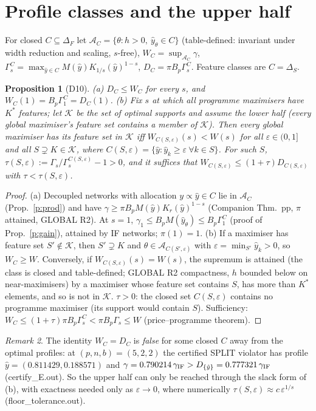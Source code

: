 \documentclass[11pt]{article}
\newtheorem{proposition}{Proposition}[section]\newtheorem{lemma}[proposition]{Lemma}\newtheorem{corollary}[proposition]{Corollary}
\theoremstyle{remark}\newtheorem{remark}[proposition]{Remark}
\begin{document}
\section{Profile classes and the upper half}
For closed $C\subseteq\Delta_F$ let $\mathcal A_C=\{\theta:h>0,\ \hat y_\theta\in C\}$ (table-defined: invariant under width reduction and scaling, $s$-free),
$W_C=\sup_{\mathcal A_C}\gamma$, $\Gamma^C_s=\max_{\hat y\in C}M(\hat y)K_{1/s}(\hat y)^{1-s}$, $D_C=\pi B_p\Gamma^C_s$. Feature classes are $C=\Delta_S$.
\begin{proposition}[D10]\label{p:uh}
(a) $D_C\le W_C$ for every $s$, and $W_C(1)=B_p\Gamma^C_1=D_C(1)$.
(b) Fix $s$ at which all programme maximisers have $K^*$ features; let $\mathcal K$ be the set of optimal supports and assume the lower half (every global maximiser's
feature set contains a member of $\mathcal K$). Then every global maximiser has its feature set in $\mathcal K$ iff $W_{C(S,\varepsilon)}(s)<W(s)$ for all
$\varepsilon\in(0,1]$ and all $S\supsetneq K\in\mathcal K$, where $C(S,\varepsilon)=\{\hat y:\hat y_k\ge\varepsilon\ \forall k\in S\}$. For such $S$,
$\tau(S,\varepsilon):=\Gamma_s/\Gamma^{C(S,\varepsilon)}_s-1>0$, and it suffices that $W_{C(S,\varepsilon)}\le(1+\tau)D_{C(S,\varepsilon)}$ with $\tau<\tau(S,\varepsilon)$.
\end{proposition}
\begin{proof}
(a) Decoupled networks with allocation $y\propto\hat y\in C$ lie in $\mathcal A_C$ (Prop.~\ref{p:prod}) and have $\gamma\ge\pi B_pM(\hat y)K_r(\hat y)^{1-s}$
(Companion Thm.~pp, $\pi$ attained, GLOBAL R2). At $s=1$, $\gamma_1\le B_pM(\hat y_\theta)\le B_p\Gamma^C_1$ (proof of Prop.~\ref{p:gain}), attained by IF networks; $\pi(1)=1$.
(b) If a maximiser has feature set $S'\notin\mathcal K$, then $S'\supsetneq K$ and $\theta\in\mathcal A_{C(S',\varepsilon)}$ with $\varepsilon=\min_{S'}\hat y_k>0$, so $W_C\ge W$.
Conversely, if $W_{C(S,\varepsilon)}(s)=W(s)$, the supremum is attained (the class is closed and table-defined; GLOBAL R2 compactness, $h$ bounded below on near-maximisers)
by a maximiser whose feature set contains $S$, has more than $K^*$ elements, and so is not in $\mathcal K$. $\tau>0$: the closed set $C(S,\varepsilon)$ contains no
programme maximiser (its support would contain $S$). Sufficiency: $W_C\le(1+\tau)\pi B_p\Gamma^C_s<\pi B_p\Gamma_s\le W$ (price--programme theorem).
\end{proof}
\begin{remark}
The identity $W_C=D_C$ is \emph{false} for some closed $C$ away from the optimal profiles: at $(p,n,b)=(5,2,2)$ the certified SPLIT violator has profile
$\hat y=(0.811429,0.188571)$ and $\gamma=0.790214\,\gamma_{\rm IF}>D_{\{\hat y\}}=0.777321\,\gamma_{\rm IF}$ (certify\_E.out). So the upper half can only be reached through the
slack form of (b), with exactness needed only as $\varepsilon\to0$, where numerically $\tau(S,\varepsilon)\approx c\,\varepsilon^{1/s}$ (floor\_tolerance.out).
\end{remark}
\end{document}
